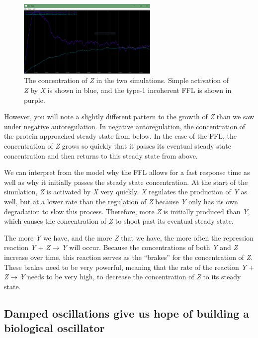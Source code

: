 \begin{figure}[h]
\centering
\mySfFamily
\includegraphics[width = 0.6\textwidth]{../images/ffl_chart.png}
\caption{The concentration of \textit{Z} in the two simulations. Simple activation of \textit{Z} by \textit{X} is shown in blue, and the type-1 incoherent FFL is shown in purple.}
\label{fig:ffl_chart}
\end{figure}

However, you will note a slightly different pattern to the growth of \textit{Z} than we saw under negative autoregulation. In negative autoregulation, the concentration of the protein approached steady state from below. In the case of the FFL, the concentration of \textit{Z} grows so quickly that it passes its eventual steady state concentration and then returns to this steady state from above.

We can interpret from the model why the FFL allows for a fast response time as well as why it initially passes the steady state concentration. At the start of the simulation, \textit{Z} is activated by \textit{X} very quickly. \textit{X} regulates the production of \textit{Y} as well, but at a lower rate than the regulation of \textit{Z} because \textit{Y} only has its own degradation to slow this process. Therefore, more \textit{Z} is initially produced than \textit{Y}, which causes the concentration of \textit{Z} to shoot past its eventual steady state.

The more \textit{Y} we have, and the more \textit{Z} that we have, the more often the repression reaction \textit{Y} + \textit{Z} → \textit{Y} will occur. Because the concentrations of both \textit{Y} and \textit{Z} increase over time, this reaction serves as the ``brakes'' for the concentration of \textit{Z}. These brakes need to be very powerful, meaning that the rate of the reaction \textit{Y} + \textit{Z} → \textit{Y} needs to be very high, to decrease the concentration of \textit{Z} to its steady state.

\FloatBarrier
{}
\subsection{Damped oscillations give us hope of building a biological oscillator}

